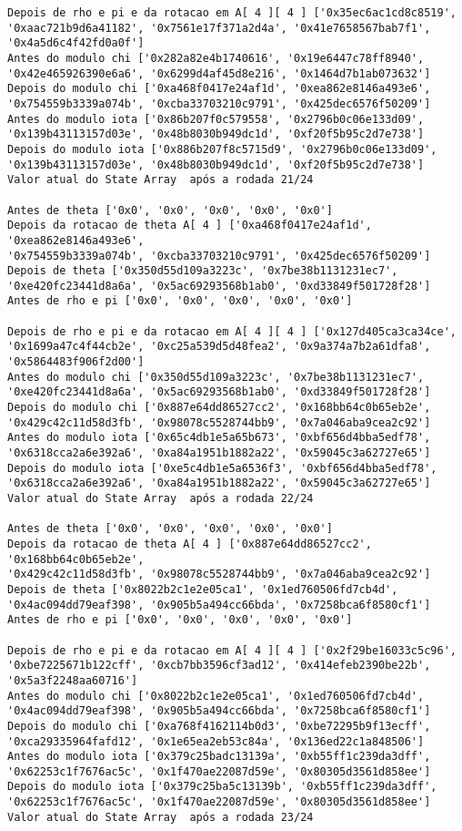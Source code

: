 \documentclass[12pt, a4paper]{article}
\begin{document}
\begin{enumerate}
\begin{enumerate}
\begin{verbatim}
Depois de rho e pi e da rotacao em A[ 4 ][ 4 ] ['0x35ec6ac1cd8c8519',
'0xaac721b9d6a41182', '0x7561e17f371a2d4a', '0x41e7658567bab7f1',
'0x4a5d6c4f42fd0a0f']
Antes do modulo chi ['0x282a82e4b1740616', '0x19e6447c78ff8940',
'0x42e465926390e6a6', '0x6299d4af45d8e216', '0x1464d7b1ab073632']
Depois do modulo chi ['0xa468f0417e24af1d', '0xea862e8146a493e6',
'0x754559b3339a074b', '0xcba33703210c9791', '0x425dec6576f50209']
Antes do modulo iota ['0x86b207f0c579558', '0x2796b0c06e133d09',
'0x139b43113157d03e', '0x48b8030b949dc1d', '0xf20f5b95c2d7e738']
Depois do modulo iota ['0x886b207f8c5715d9', '0x2796b0c06e133d09',
'0x139b43113157d03e', '0x48b8030b949dc1d', '0xf20f5b95c2d7e738']
Valor atual do State Array  após a rodada 21/24

Antes de theta ['0x0', '0x0', '0x0', '0x0', '0x0']
Depois da rotacao de theta A[ 4 ] ['0xa468f0417e24af1d', '0xea862e8146a493e6',
'0x754559b3339a074b', '0xcba33703210c9791', '0x425dec6576f50209']
Depois de theta ['0x350d55d109a3223c', '0x7be38b1131231ec7',
'0xe420fc23441d8a6a', '0x5ac69293568b1ab0', '0xd33849f501728f28']
Antes de rho e pi ['0x0', '0x0', '0x0', '0x0', '0x0']

Depois de rho e pi e da rotacao em A[ 4 ][ 4 ] ['0x127d405ca3ca34ce',
'0x1699a47c4f44cb2e', '0xc25a539d5d48fea2', '0x9a374a7b2a61dfa8',
'0x5864483f906f2d00']
Antes do modulo chi ['0x350d55d109a3223c', '0x7be38b1131231ec7',
'0xe420fc23441d8a6a', '0x5ac69293568b1ab0', '0xd33849f501728f28']
Depois do modulo chi ['0x887e64dd86527cc2', '0x168bb64c0b65eb2e',
'0x429c42c11d58d3fb', '0x98078c5528744bb9', '0x7a046aba9cea2c92']
Antes do modulo iota ['0x65c4db1e5a65b673', '0xbf656d4bba5edf78',
'0x6318cca2a6e392a6', '0xa84a1951b1882a22', '0x59045c3a62727e65']
Depois do modulo iota ['0xe5c4db1e5a6536f3', '0xbf656d4bba5edf78',
'0x6318cca2a6e392a6', '0xa84a1951b1882a22', '0x59045c3a62727e65']
Valor atual do State Array  após a rodada 22/24

Antes de theta ['0x0', '0x0', '0x0', '0x0', '0x0']
Depois da rotacao de theta A[ 4 ] ['0x887e64dd86527cc2', '0x168bb64c0b65eb2e',
'0x429c42c11d58d3fb', '0x98078c5528744bb9', '0x7a046aba9cea2c92']
Depois de theta ['0x8022b2c1e2e05ca1', '0x1ed760506fd7cb4d',
'0x4ac094dd79eaf398', '0x905b5a494cc66bda', '0x7258bca6f8580cf1']
Antes de rho e pi ['0x0', '0x0', '0x0', '0x0', '0x0']

Depois de rho e pi e da rotacao em A[ 4 ][ 4 ] ['0x2f29be16033c5c96',
'0xbe7225671b122cff', '0xcb7bb3596cf3ad12', '0x414efeb2390be22b',
'0x5a3f2248aa60716']
Antes do modulo chi ['0x8022b2c1e2e05ca1', '0x1ed760506fd7cb4d',
'0x4ac094dd79eaf398', '0x905b5a494cc66bda', '0x7258bca6f8580cf1']
Depois do modulo chi ['0xa768f4162114b0d3', '0xbe72295b9f13ecff',
'0xca29335964fafd12', '0x1e65ea2eb53c84a', '0x136ed22c1a848506']
Antes do modulo iota ['0x379c25badc13139a', '0xb55ff1c239da3dff',
'0x62253c1f7676ac5c', '0x1f470ae22087d59e', '0x80305d3561d858ee']
Depois do modulo iota ['0x379c25ba5c13139b', '0xb55ff1c239da3dff',
'0x62253c1f7676ac5c', '0x1f470ae22087d59e', '0x80305d3561d858ee']
Valor atual do State Array  após a rodada 23/24


\end{verbatim}
\end{enumerate}
\end{enumerate}
\end{document}
